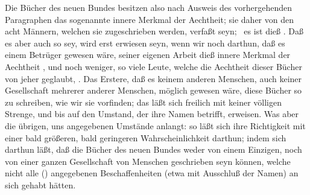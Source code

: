 Die Bücher des neuen Bundes besitzen also nach Ausweis des vorhergehenden Paragraphen das sogenannte innere Merkmal der Aechtheit; sie  daher von den acht Männern, welchen sie zugeschrieben werden, verfaßt seyn; \dh\ es ist dieß . Daß es aber auch  so sey, wird erst erwiesen seyn, wenn wir noch darthun, daß es einem Betrüger  gewesen wäre, seiner eigenen Arbeit dieß innere Merkmal der Aechtheit , und noch weniger, so viele Leute, welche die Aechtheit dieser Bücher von jeher geglaubt, . Das Erstere, daß es keinem anderen Menschen, auch keiner Gesellschaft mehrerer anderer Menschen, möglich gewesen wäre, diese Bücher so zu schreiben, wie wir sie vorfinden; das läßt sich freilich mit keiner völligen Strenge, und bis auf den Umstand, der ihre Namen betrifft, erweisen. Was aber die übrigen, uns angegebenen Umstände anlangt: so läßt sich ihre Richtigkeit mit einer bald größeren, bald geringeren Wahrscheinlichkeit darthun; indem sich darthun läßt, daß die Bücher des neuen Bundes weder von einem Einzigen, noch von einer ganzen Gesellschaft von Menschen geschrieben seyn können, welche nicht alle () angegebenen Beschaffenheiten (etwa mit Ausschluß der Namen) an sich gehabt hätten.
